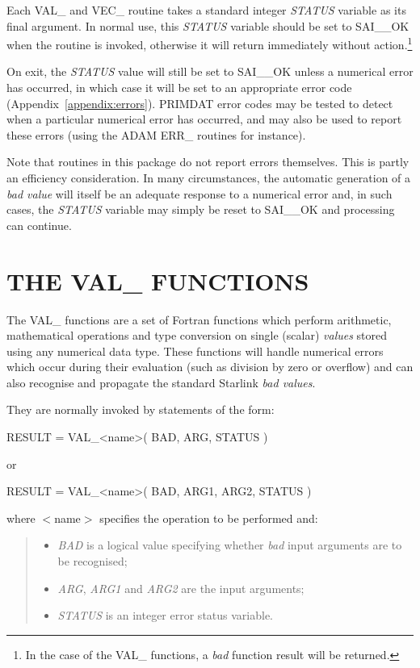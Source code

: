 \documentclass[11pt,nolof]{starlink}
\providecommand{\name}[1]{\mbox{#1}}
\providecommand{\fortvar}[1]{\mbox{\emph{#1}}}
\begin{document}
Each \name{VAL\_} and \name{VEC\_} routine takes a standard
integer \fortvar{STATUS} variable as its final argument.
In normal use, this \fortvar{STATUS} variable should be set to
\name{SAI\_\_OK} when the routine is invoked, otherwise it will return
immediately without action.\footnote{
In the case of the \name{VAL\_} functions, a \emph{bad} function result will
be returned.}

On exit, the \fortvar{STATUS} value will still be set to \name{SAI\_\_OK}
unless a numerical error has occurred, in which case it will be set to an
appropriate error code (Appendix~\ref{appendix:errors}).
\name{PRIMDAT} error codes may be tested to detect when a particular
numerical error has occurred, and may also be used to report these errors
(using the \name{ADAM} \name{ERR\_} routines for instance).

Note that routines in this package do not report errors themselves.
This is partly an efficiency consideration.
In many circumstances, the automatic generation of a \emph{bad value} will
itself be an adequate response to a numerical error and, in such cases, the
\fortvar{STATUS} variable may simply be reset to \name{SAI\_\_OK} and
processing can continue.

\section{THE \name{VAL\_} FUNCTIONS}

\label{section:val}

The \name{VAL\_} functions are a set of Fortran functions which perform
arithmetic, mathematical operations and type conversion on single (scalar)
\emph{values} stored using any numerical data type.
These functions will handle numerical errors which occur during their
evaluation (such as division by zero or overflow) and can also recognise and
propagate the standard Starlink \emph{bad values}.

They are normally invoked by statements of the form:

\begin{terminalv}
RESULT = VAL_<name>( BAD, ARG, STATUS )
\end{terminalv}
or
\begin{terminalv}
RESULT = VAL_<name>( BAD, ARG1, ARG2, STATUS )
\end{terminalv}

where \name{$<$name$>$} specifies the operation to be performed and:

\begin{quote}
\begin{itemize}

\item \fortvar{BAD} is a logical value specifying whether \emph{bad}
input arguments are to be recognised;

\item \fortvar{ARG}, \fortvar{ARG1} and \fortvar{ARG2} are the input
arguments;

\item \fortvar{STATUS} is an integer error status variable.

\end{itemize}
\end{quote}
\end{document}
